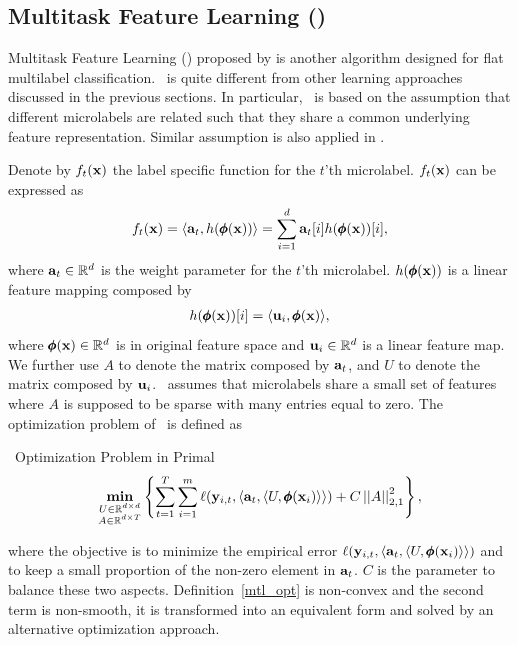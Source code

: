 {%
%
\subsection{Multitask Feature Learning (\mtl)} \label{sc_mtl}

Multitask Feature Learning (\mtl) proposed by \citet{Argyriou07multitask} is another algorithm designed for flat multilabel classification.
\mtl\ is quite different from other learning approaches discussed in the previous sections.
In particular, \mtl\ is based on the assumption that different microlabels are related such that they share a common underlying feature representation.
Similar assumption is also applied in \citep{Caruana97multitask,Baxter00a,BenDavide03exploiting}.

Denote by $f_t(\mathbf {x})$ the label specific function for the $t$'th microlabel.
$f_t(\mathbf {x})$ can be expressed as
\begin{align*}
	f_t(\mathbf {x}) = \langle \mathbf {a}_t, h(\pmb \phi(\mathbf {x})) \rangle = \sum_{i=1}^{d}\mathbf {a}_{t}[i]h(\pmb \phi(\mathbf {x}))[i],
\end{align*}
where $\mathbf {a}_t\in\mathbb{R}^d$ is the weight parameter for the $t$'th microlabel.
$h(\pmb \phi(\mathbf {x}))$ is a linear feature mapping composed by
\begin{align*}
	h(\pmb \phi(\mathbf {x}))[i] = \langle \mathbf {u}_i, \pmb \phi(\mathbf {x}) \rangle,
\end{align*}
where $\pmb \phi(\mathbf {x})\in\mathbb{R}^d$ is in original feature space and $\mathbf {u}_i\in\mathbb{R}^{d}$ is a linear feature map.
We further use $A$ to denote the matrix composed by $\mathbf {a}_{t}$, and $U$ to denote the matrix composed by $\mathbf {u}_i$.
\mtl\ assumes that microlabels share a small set of features where $A$ is supposed to be sparse with many entries equal to zero.
The optimization problem of \mtl\ is defined as
\begin{definition}{\mtl\ Optimization Problem in Primal}\label{mtl_opt}
	\begin{align*}
		\underset{\substack{U\in\mathbb{R}^{d\times d}\\A\in\mathbb{R}^{d\times T}}}{\textbf{min}} \left\{\sum_{t=1}^{T}\sum_{i=1}^{m}\ell(\mathbf {y}_{i,t},\langle \mathbf {a}_t, \langle U, \pmb \phi(\mathbf {x}_i) \rangle \rangle)+C\left|\left| A \right|\right|_{2,1}^2\right\},
	\end{align*}
\end{definition}
\noindent
where the objective is to minimize the empirical error $\ell(\mathbf {y}_{i,t},\langle \mathbf {a}_t, \langle U, \pmb \phi(\mathbf {x}_i) \rangle \rangle)$ and to keep a small proportion of the non-zero element in $\mathbf {a}_t$.
$C$ is the parameter to balance these two aspects.
Definition~\ref{mtl_opt} is non-convex and the second term is non-smooth, it is transformed into an equivalent form and solved by an alternative optimization approach.

}
